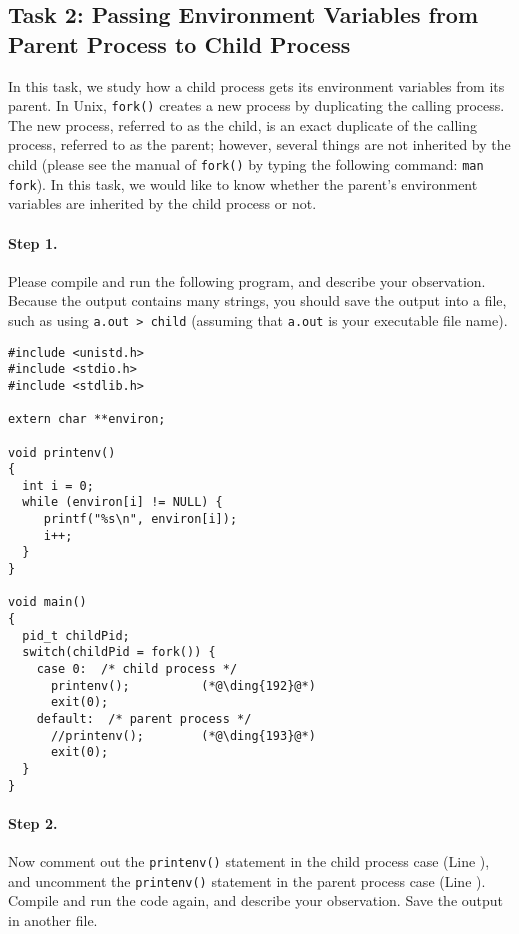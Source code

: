 \subsection{Task 2: Passing Environment Variables from Parent Process to Child Process}


In this task, we study how a child process gets 
its environment variables from its parent. In Unix,
{\tt fork()} creates a new process by duplicating the calling process.
The new process, referred to as the child, is an exact duplicate of the calling 
process, referred to as the parent; however, several things 
are not inherited by the child (please see the manual of {\tt fork()} by
typing the following command: {\tt man fork}). In this task,
we would like to know whether the parent's environment variables
are inherited by the child process or not.


\paragraph{Step 1.} Please compile and run the following
program,  and describe your observation. Because the output 
contains many strings, you should save the output into a file, such as
using {\tt a.out > child} (assuming that {\tt a.out} is your 
executable file name).


\begin{lstlisting}
#include <unistd.h>
#include <stdio.h>
#include <stdlib.h>

extern char **environ;

void printenv()
{
  int i = 0;
  while (environ[i] != NULL) {
     printf("%s\n", environ[i]);
     i++;
  }
}

void main()
{
  pid_t childPid;
  switch(childPid = fork()) {
    case 0:  /* child process */
      printenv();          (*@\ding{192}@*)
      exit(0);
    default:  /* parent process */
      //printenv();        (*@\ding{193}@*)
      exit(0);
  }
}
\end{lstlisting}

\paragraph{Step 2.} Now comment out the {\tt printenv()} statement in
the child process case (Line ), 
and uncomment the {\tt printenv()} statement in
the parent process case (Line ). 
Compile and run the code again, and describe your 
observation. Save the output in another file.


